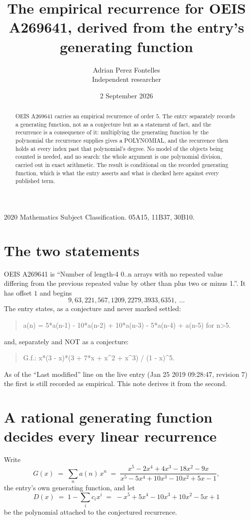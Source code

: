 \documentclass[11pt,a4paper]{article}
\title{The empirical recurrence for OEIS A269641, derived from the entry's generating function}
\author{Adrian Perez Fontelles\\ \small Independent researcher}
\date{2 September 2026}
\theoremstyle{plain}
\theoremstyle{definition}
\begin{document}
\maketitle

\begin{abstract}
OEIS A269641 carries an empirical recurrence of order $5$. The entry separately records a
generating function, not as a conjecture but as a statement of fact, and the recurrence is a
consequence of it: multiplying the generating function by the polynomial the recurrence
supplies gives a POLYNOMIAL, and the recurrence then holds at every index past that
polynomial's degree. No model of the objects being counted is needed, and no search: the
whole argument is one polynomial division, carried out in exact arithmetic. The result is
conditional on the recorded generating function, which is what the entry asserts and what is
checked here against every published term.
\end{abstract}

\noindent\small 2020 Mathematics Subject Classification. 05A15, 11B37, 30B10.\normalsize

\section{The two statements}

OEIS A269641 is ``Number of length-4 0..n arrays with no repeated value differing from the previous repeated value by other than plus two or minus 1.''. It has offset $1$ and begins
\[
9, 63, 221, 567, 1209, 2279, 3933, 6351,\ \dots
\]
The entry states, as a conjecture and never marked settled:
\begin{quote}
a(n) = 5*a(n-1) - 10*a(n-2) + 10*a(n-3) - 5*a(n-4) + a(n-5) for n>5.
\end{quote}
and, separately and NOT as a conjecture:
\begin{quote}
G.f.: x*(3 - x)*(3 + 7*x + x\^{}2 + x\^{}3) / (1 - x)\^{}5.
\end{quote}
As of the ``Last modified'' line on the live entry (Jan 25 2019 09:28:47, revision 7) the first is still
recorded as empirical. This note derives it from the second.

\section{A rational generating function decides every linear recurrence}

Write
\[
G(x)\;=\;\sum_{n}a(n)\,x^{n}\;=\;\frac{x^{5} - 2 x^{4} + 4 x^{3} - 18 x^{2} - 9 x}{x^{5} - 5 x^{4} + 10 x^{3} - 10 x^{2} + 5 x - 1},
\]
the entry's own generating function, and let
\[
D(x)\;=\;1-\sum_i c_i x^{i}\;=\;- x^{5} + 5 x^{4} - 10 x^{3} + 10 x^{2} - 5 x + 1
\]
be the polynomial attached to the conjectured recurrence.
\end{document}
